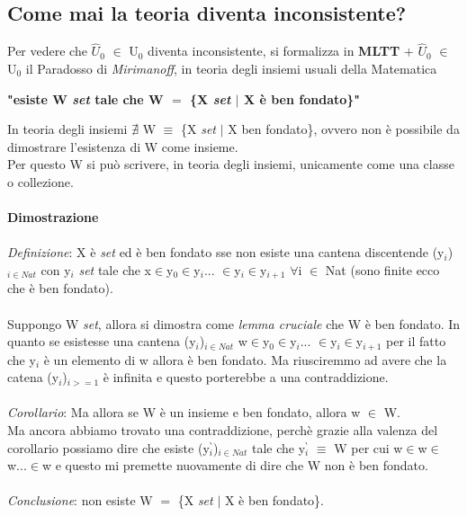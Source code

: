 \subsection{Come mai la teoria diventa inconsistente?}
\label{subsec:teoria-inconsistente}
Per vedere che $\hat{U}_0$ $\in$ U$_0$ diventa inconsistente, si formalizza in \textbf{MLTT} $+$ $\hat{U}_0$ $\in$ U$_0$ il Paradosso di \textit{Mirimanoff}, in teoria degli insiemi usuali della Matematica
\begin{center}
\textbf{"esiste W \textit{set} tale che W $=$ \{X \textit{set} $|$ X \`e ben fondato\}"}
\end{center}
In teoria degli insiemi $\nexists$ W $\equiv$ \{X \textit{set} $|$ X ben fondato\}, ovvero non \`e possibile da dimostrare l'esistenza di W come insieme.\\
Per questo W si pu\`o scrivere, in teoria degli insiemi, unicamente come una classe o collezione.\\\\
\noindent
\textbf{Dimostrazione}\\\\
\noindent
\textit{Definizione}:
X \`e \textit{set} ed \`e ben fondato sse non esiste una cantena discentende (y$_i$)$_{i \in Nat}$ con y$_i$ \textit{set} tale che x$\in$y$_0\in$y$_i$... $\in$y$_i\in$y$_{i+1}$ $\forall$i $\in$ Nat (sono finite ecco che \`e ben fondato).\\\\
\noindent
Suppongo W \textit{set}, allora si dimostra come \textit{lemma cruciale} che W \`e ben fondato. In quanto se esistesse una cantena (y$_i$)$_{i \in Nat}$ w$\in$y$_0\in$y$_i$... $\in$y$_i\in$y$_{i+1}$ per il fatto che y$_i$ \`e un elemento di w allora \`e ben fondato. Ma riusciremmo ad avere che la catena (y$_i$)$_{i>=1}$ \`e infinita e questo porterebbe a una contraddizione.\\\\
\noindent
\textit{Corollario}: Ma allora se W \`e un insieme e ben fondato, allora w $\in$ W.\\
Ma ancora abbiamo trovato una contraddizione, perch\`e grazie alla valenza del corollario possiamo dire che esiste (y$_i^\backprime$)$_{i \in Nat}$ tale che y$_i^\backprime$ $\equiv$ W per cui w$\in$w$\in$w...$\in$w e questo mi premette nuovamente di dire che W non \`e ben fondato.\\\\
\noindent
\textit{Conclusione}: non esiste W $=$ \{X \textit{set} $|$ X \`e ben fondato\}. 
\\\\
